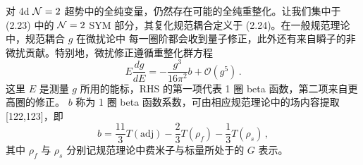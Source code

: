 对 4d $\mathcal{N}=2$ 超势中的全纯变量，仍然存在可能的全纯重整化。让我们集中于 (2.23) 中的
$\mathcal{N}=2$ SYM 部分，其复化规范耦合定义于 (2.24)。在一般规范理论中，规范耦合 $g$ 在微扰论中
每一圈阶都会收到量子修正，此外还有来自瞬子的非微扰贡献。特别地，微扰修正遵循重整化群方程
\begin{equation}
  E\frac{dg}{dE}=-\frac{g^3}{16\pi^2}b+\mathcal O(g^5)\,.
  \tag{2.36}
\end{equation}
这里 $E$ 是测量 $g$ 所用的能标，RHS 的第一项代表 1 圈 beta 函数，第二项来自更高圈的修正。
$b$ 称为 1 圈 beta 函数系数，可由相应规范理论中的场内容提取 [122,123]，即
\begin{equation}
  b=\frac{11}{3}T(\mathrm{adj})-\frac{2}{3}T(\rho_f)-\frac{1}{3}T(\rho_s)\,,
  \tag{2.37}
\end{equation}
其中 $\rho_f$ 与 $\rho_s$ 分别记规范理论中费米子与标量所处于的 $G$ 表示。

